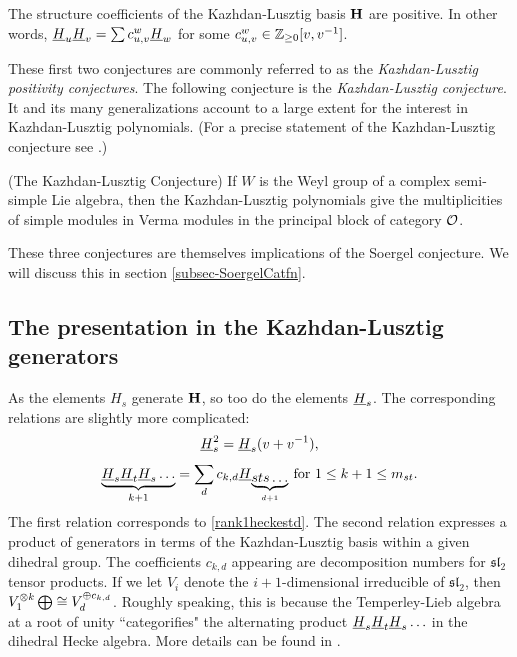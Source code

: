 \begin{conj} The structure coefficients of the Kazhdan-Lusztig basis ${\mathbf H}$ are positive. In other words, $\underline{H}_u \underline{H}_v = \sum c^w_{u,v} \underline{H}_w$ for some $c^w_{u,v} \in {\mathbb{Z}}_{\ge 0}[v,v^{-1}]$. \end{conj}

These first two conjectures are commonly referred to as the \emph{Kazhdan-Lusztig positivity conjectures}. The following conjecture is the \emph{Kazhdan-Lusztig conjecture}. It and its many generalizations account to a large extent for the interest in Kazhdan-Lusztig polynomials. (For a precise statement of the Kazhdan-Lusztig conjecture see \cite{KaL1}.)

\begin{conj} (The Kazhdan-Lusztig Conjecture) If $W$ is the Weyl group of a complex semi-simple Lie algebra, then the Kazhdan-Lusztig polynomials give the multiplicities of simple modules in Verma modules in the principal block of category ${\mathcal{O}}$.\end{conj}

These three conjectures are themselves implications of the Soergel conjecture. We will discuss this in section \ref{subsec-SoergelCatfn}.

\subsection{The presentation in the Kazhdan-Lusztig generators}
\label{subsec-KLpresentation}

As the elements $H_s$ generate ${\mathbf H}$, so too do the elements $\underline{H}_s$. The corresponding relations are slightly more complicated:
\begin{equation} \underline{H}_s^2 = \underline{H}_s (v+v^{-1}), \label{rank1hecke} \end{equation}
\begin{equation} \underbrace{\underline{H}_s\underline{H}_t\underline{H}_s\ldots}_{k+1} = \sum_d  c_{k,d} \underline{H}_{\underbrace{sts\ldots}_{d+1}} \ \mathrm{ for }\ 1 \le k+1 \le m_{st}.  \label{rank2hecke} \end{equation}
The first relation corresponds to \eqref{rank1heckestd}.
The second relation expresses a product of generators in terms of the Kazhdan-Lusztig basis within a given dihedral group. The coefficients $c_{k,d}$ appearing are decomposition
numbers for $\mathfrak{sl}_2$ tensor products. If we let $V_i$ denote the $i+1$-dimensional irreducible of $\mathfrak{sl}_2$, then $V_1^{\otimes k} \bigoplus \cong V_d^{\oplus c_{k,d}}$. Roughly
speaking, this is because the Temperley-Lieb algebra at a root of unity ``categorifies" the alternating product $\underline{H}_s \underline{H}_t \underline{H}_s \ldots$ in the dihedral Hecke algebra. More details can be
found in \cite{EDihedral}.

